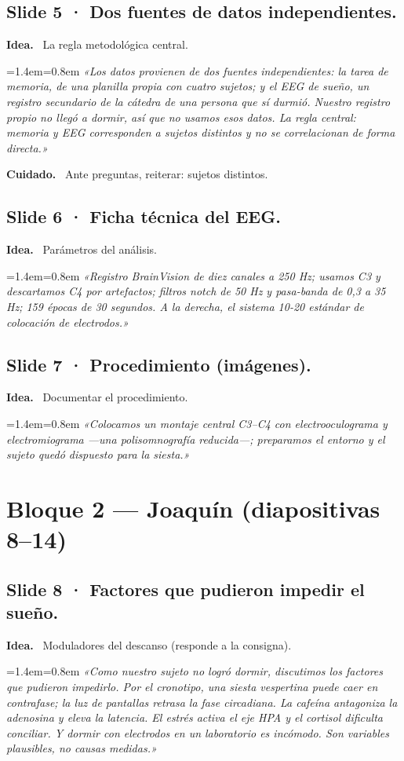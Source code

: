 \documentclass[11pt,a4paper]{article}
\newenvironment{guion}%
{\par\smallskip\begingroup\leftskip=1.4em\rightskip=0.8em\color{ink}\itshape}%
{\par\endgroup\smallskip}
\newcommand{\lab}[1]{\textbf{\color{ink}#1}\ }
\begin{document}
\subsection{Slide 5 · Dos fuentes de datos independientes.}
\lab{Idea.} La regla metodológica central.
\begin{guion}
«Los datos provienen de dos fuentes independientes: la tarea de memoria, de una planilla propia con
cuatro sujetos; y el EEG de sueño, un registro secundario de la cátedra de una persona que sí durmió.
Nuestro registro propio no llegó a dormir, así que no usamos esos datos. La regla central: memoria y
EEG corresponden a sujetos distintos y no se correlacionan de forma directa.»
\end{guion}
\lab{Cuidado.} Ante preguntas, reiterar: sujetos distintos.

\subsection{Slide 6 · Ficha técnica del EEG.}
\lab{Idea.} Parámetros del análisis.
\begin{guion}
«Registro BrainVision de diez canales a 250 Hz; usamos C3 y descartamos C4 por artefactos; filtros
notch de 50 Hz y pasa-banda de 0,3 a 35 Hz; 159 épocas de 30 segundos. A la derecha, el sistema 10-20
estándar de colocación de electrodos.»
\end{guion}

\subsection{Slide 7 · Procedimiento (imágenes).}
\lab{Idea.} Documentar el procedimiento.
\begin{guion}
«Colocamos un montaje central C3--C4 con electrooculograma y electromiograma —una polisomnografía
reducida—; preparamos el entorno y el sujeto quedó dispuesto para la siesta.»
\end{guion}

\section{Bloque 2 — Joaquín (diapositivas 8--14)}

\subsection{Slide 8 · Factores que pudieron impedir el sueño.}
\lab{Idea.} Moduladores del descanso (responde a la consigna).
\begin{guion}
«Como nuestro sujeto no logró dormir, discutimos los factores que pudieron impedirlo. Por el cronotipo,
una siesta vespertina puede caer en contrafase; la luz de pantallas retrasa la fase circadiana. La
cafeína antagoniza la adenosina y eleva la latencia. El estrés activa el eje HPA y el cortisol dificulta
conciliar. Y dormir con electrodos en un laboratorio es incómodo. Son variables plausibles, no causas
medidas.»
\end{guion}
\end{document}
